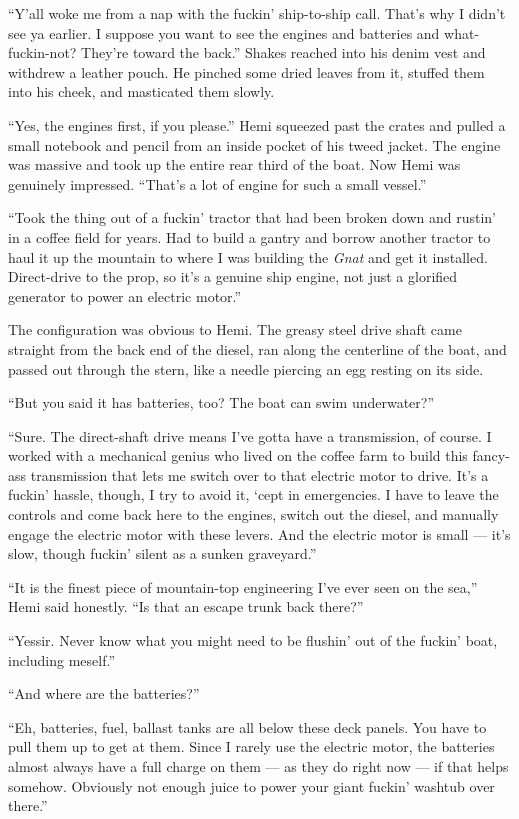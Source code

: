 \documentclass[
]{scrbook}
\begin{document}
``Y'all woke me from a nap with the fuckin' ship-to-ship call. That's
why I didn't see ya earlier. I suppose you want to see the engines and
batteries and what-fuckin-not? They're toward the back.'' Shakes reached
into his denim vest and withdrew a leather pouch. He pinched some dried
leaves from it, stuffed them into his cheek, and masticated them slowly.

``Yes, the engines first, if you please.'' Hemi squeezed past the crates
and pulled a small notebook and pencil from an inside pocket of his
tweed jacket. The engine was massive and took up the entire rear third
of the boat. Now Hemi was genuinely impressed. ``That's a lot of engine
for such a small vessel.''

``Took the thing out of a fuckin' tractor that had been broken down and
rustin' in a coffee field for years. Had to build a gantry and borrow
another tractor to haul it up the mountain to where I was building the
\emph{Gnat} and get it installed. Direct-drive to the prop, so it's a
genuine ship engine, not just a glorified generator to power an electric
motor.''

The configuration was obvious to Hemi. The greasy steel drive shaft came
straight from the back end of the diesel, ran along the centerline of
the boat, and passed out through the stern, like a needle piercing an
egg resting on its side.

``But you said it has batteries, too? The boat can swim underwater?''

``Sure. The direct-shaft drive means I've gotta have a transmission, of
course. I worked with a mechanical genius who lived on the coffee farm
to build this fancy-ass transmission that lets me switch over to that
electric motor to drive. It's a fuckin' hassle, though, I try to avoid
it, `cept in emergencies. I have to leave the controls and come back
here to the engines, switch out the diesel, and manually engage the
electric motor with these levers. And the electric motor is small ---
it's slow, though fuckin' silent as a sunken graveyard.''

``It is the finest piece of mountain-top engineering I've ever seen on
the sea,'' Hemi said honestly. ``Is that an escape trunk back there?''

``Yessir. Never know what you might need to be flushin' out of the
fuckin' boat, including meself.''

``And where are the batteries?''

``Eh, batteries, fuel, ballast tanks are all below these deck panels.
You have to pull them up to get at them. Since I rarely use the electric
motor, the batteries almost always have a full charge on them --- as
they do right now --- if that helps somehow. Obviously not enough juice
to power your giant fuckin' washtub over there.''
\end{document}
